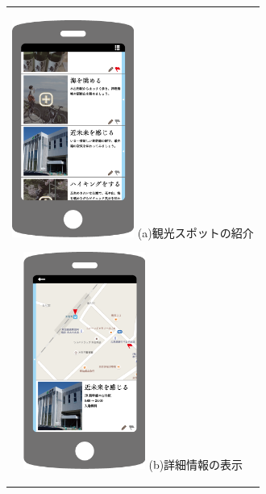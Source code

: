 \begin{figure}[htbp]
  \begin{center}
    \begin{tabular}{c}

      \begin{minipage}{0.33\hsize}
        \begin{center}
\includegraphics[width=4cm, bb=0 0 320 552]{画面案1.png}
          \hspace{1cm} (a)観光スポットの紹介
        \end{center}
      \end{minipage}

      \begin{minipage}{0.33\hsize}
        \begin{center}
\includegraphics[width=4cm, bb=0 0 321 547]{画面案2.png}
          \hspace{1cm} (b)詳細情報の表示
        \end{center}
      \end{minipage}


\end{tabular}
\end{center}
\end{figure}
